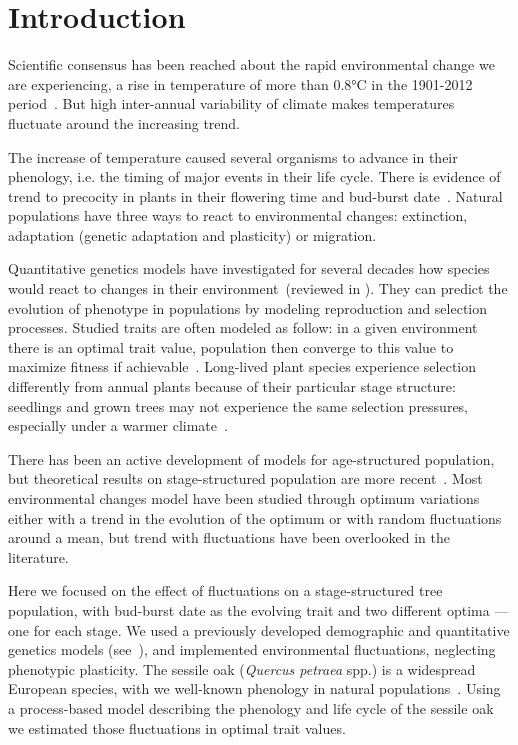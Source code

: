 \label{sec:Intro}
\section*{Introduction}

Scientific consensus has been reached about the rapid environmental change we are experiencing, a rise in temperature of more than 0.8°C in the 1901-2012 period~\citep{stocker_ipcc_2013}. But high inter-annual variability of climate makes temperatures fluctuate around the increasing trend.

The increase of temperature caused several organisms to advance in their phenology, i.e. the timing of major events in their life cycle. There is evidence of trend to precocity in plants in their flowering time and bud-burst date~\citep{alberto_adaptive_2011, gienapp_predicting_2013}. Natural populations have three ways to react to environmental changes: extinction, adaptation (genetic adaptation and plasticity) or migration.

Quantitative genetics models have investigated for several decades how species would react to changes in their environment~(reviewed in \citealt{burger_quantitative-genetic_2004}). They can predict the evolution of phenotype in populations by modeling reproduction and selection processes. Studied traits are often modeled as follow: in a given environment there is an optimal trait value, population then converge to this value to maximize fitness if achievable~\citep{lande_quantitative_1982}.
Long-lived plant species experience selection differently from annual plants because of their particular stage structure: seedlings and grown trees may not experience the same selection pressures, especially  under a warmer climate~\citep{lande_quantitative_1982, coulson_dynamics_2008, barfield_evolution_2011, engen_evolution_2011}.

There has been an active development of models for age-structured population, but theoretical results on stage-structured population are more recent~\citep{barfield_evolution_2011}. Most environmental changes model have been studied through optimum variations either with a trend in the evolution of the optimum or with random fluctuations around a mean, but trend with fluctuations have been overlooked in the literature.

Here we focused on the effect of fluctuations on a stage-structured tree population, with bud-burst date as the evolving trait and two different optima — one for each stage.
We used a previously developed demographic and quantitative genetics models (see~), and implemented environmental fluctuations, neglecting phenotypic plasticity. The sessile oak (\textit{Quercus petraea} spp.) is a widespread European species, with we well-known phenology in natural populations~\citep{alberto_adaptive_2011}. Using a process-based model describing the phenology and life cycle of the sessile oak we estimated those fluctuations in optimal trait values.